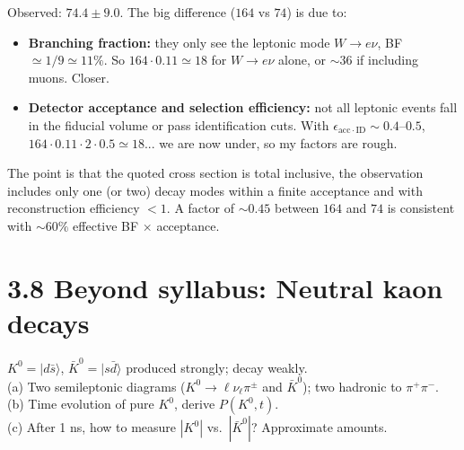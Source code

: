 \documentclass[11pt]{article}
\newcommand{\Q}[1]{\begin{question}#1\end{question}}
\begin{document}
Observed: $74.4\pm 9.0$. The big difference ($164$ vs $74$) is due to:
\begin{itemize}[itemsep=1pt]
\item \textbf{Branching fraction:} they only see the leptonic mode $W\to e\nu$, BF$\simeq 1/9\simeq 11\%$. So $164\cdot 0.11\simeq 18$ for $W\to e\nu$ alone, or $\sim 36$ if including muons. Closer.
\item \textbf{Detector acceptance and selection efficiency:} not all leptonic events fall in the fiducial volume or pass identification cuts. With $\epsilon_\mathrm{acc\cdot ID}\sim 0.4$--$0.5$, $164\cdot 0.11\cdot 2\cdot 0.5\simeq 18$... we are now under, so my factors are rough.
\end{itemize}
The point is that the quoted cross section is total inclusive, the observation includes only one (or two) decay modes within a finite acceptance and with reconstruction efficiency $<1$. A factor of $\sim 0.45$ between $164$ and $74$ is consistent with $\sim 60\%$ effective BF $\times$ acceptance.

\section*{3.8 \quad Beyond syllabus: Neutral kaon decays}

\Q{$K^0=|d\bar s\rangle$, $\bar K^0=|s\bar d\rangle$ produced strongly; decay weakly.\\
(a) Two semileptonic diagrams ($K^0\to\ell\nu_\ell\pi^\pm$ and $\bar K^0$); two hadronic to $\pi^+\pi^-$.\\
(b) Time evolution of pure $K^0$, derive $P(K^0,t)$.\\
(c) After 1 ns, how to measure $|K^0|$ vs.\ $|\bar K^0|$? Approximate amounts.}
\end{document}
